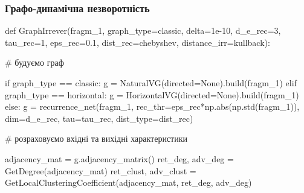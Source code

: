 \documentclass[
  letterpaper,
]{report}
\newenvironment{Shaded}{\begin{snugshade}}{\end{snugshade}}
\newcommand{\BuiltInTok}[1]{\textcolor[rgb]{0.00,0.23,0.31}{#1}}
\newcommand{\CommentTok}[1]{\textcolor[rgb]{0.37,0.37,0.37}{#1}}
\newcommand{\ControlFlowTok}[1]{\textcolor[rgb]{0.00,0.23,0.31}{#1}}
\newcommand{\DecValTok}[1]{\textcolor[rgb]{0.68,0.00,0.00}{#1}}
\newcommand{\FloatTok}[1]{\textcolor[rgb]{0.68,0.00,0.00}{#1}}
\newcommand{\KeywordTok}[1]{\textcolor[rgb]{0.00,0.23,0.31}{#1}}
\newcommand{\NormalTok}[1]{\textcolor[rgb]{0.00,0.23,0.31}{#1}}
\newcommand{\OperatorTok}[1]{\textcolor[rgb]{0.37,0.37,0.37}{#1}}
\newcommand{\StringTok}[1]{\textcolor[rgb]{0.13,0.47,0.30}{#1}}
\newcommand{\VariableTok}[1]{\textcolor[rgb]{0.07,0.07,0.07}{#1}}
\begin{document}
\hypertarget{ux433ux440ux430ux444ux43e-ux434ux438ux43dux430ux43cux456ux447ux43dux430-ux43dux435ux437ux432ux43eux440ux43eux442ux43dux456ux441ux442ux44c}{%
\subsubsection{Графо-динамічна
незворотність}\label{ux433ux440ux430ux444ux43e-ux434ux438ux43dux430ux43cux456ux447ux43dux430-ux43dux435ux437ux432ux43eux440ux43eux442ux43dux456ux441ux442ux44c}}

\begin{Shaded}
\begin{Highlighting}[]
\KeywordTok{def}\NormalTok{ GraphIrrever(fragm\_1, graph\_type}\OperatorTok{=}\StringTok{\textquotesingle{}classic\textquotesingle{}}\NormalTok{, delta}\OperatorTok{=}\FloatTok{1e{-}10}\NormalTok{, d\_e\_rec}\OperatorTok{=}\DecValTok{3}\NormalTok{, tau\_rec}\OperatorTok{=}\DecValTok{1}\NormalTok{, eps\_rec}\OperatorTok{=}\FloatTok{0.1}\NormalTok{, dist\_rec}\OperatorTok{=}\StringTok{\textquotesingle{}chebyshev\textquotesingle{}}\NormalTok{, distance\_irr}\OperatorTok{=}\StringTok{\textquotesingle{}kullback\textquotesingle{}}\NormalTok{):}
    
    \CommentTok{\# будуємо граф }
    
    \ControlFlowTok{if}\NormalTok{ graph\_type }\OperatorTok{==} \StringTok{\textquotesingle{}classic\textquotesingle{}}\NormalTok{:}
\NormalTok{        g }\OperatorTok{=}\NormalTok{ NaturalVG(directed}\OperatorTok{=}\VariableTok{None}\NormalTok{).build(fragm\_1)}
    \ControlFlowTok{elif}\NormalTok{ graph\_type }\OperatorTok{==} \StringTok{\textquotesingle{}horizontal\textquotesingle{}}\NormalTok{:}
\NormalTok{        g }\OperatorTok{=}\NormalTok{ HorizontalVG(directed}\OperatorTok{=}\VariableTok{None}\NormalTok{).build(fragm\_1)}
    \ControlFlowTok{else}\NormalTok{:}
\NormalTok{        g }\OperatorTok{=}\NormalTok{ recurrence\_net(fragm\_1, rec\_thr}\OperatorTok{=}\NormalTok{eps\_rec}\OperatorTok{*}\NormalTok{np.}\BuiltInTok{abs}\NormalTok{(np.std(fragm\_1)), dim}\OperatorTok{=}\NormalTok{d\_e\_rec, tau}\OperatorTok{=}\NormalTok{tau\_rec, dist\_type}\OperatorTok{=}\NormalTok{dist\_rec)}
    
    \CommentTok{\# розраховуємо вхідні та вихідні характеристики }
    
\NormalTok{    adjacency\_mat }\OperatorTok{=}\NormalTok{ g.adjacency\_matrix()}
\NormalTok{    ret\_deg, adv\_deg }\OperatorTok{=}\NormalTok{ GetDegree(adjacency\_mat)}
\NormalTok{    ret\_clust, adv\_clust }\OperatorTok{=}\NormalTok{ GetLocalClusteringCoefficient(adjacency\_mat, ret\_deg, adv\_deg)}
    

\end{Highlighting}
\end{Shaded}
\end{document}

